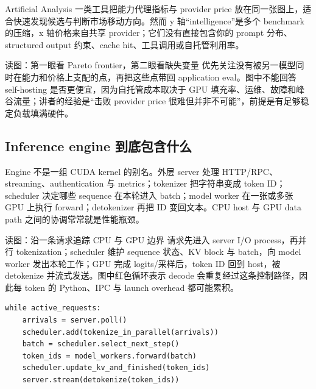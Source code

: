 Artificial Analysis 一类工具把能力代理指标与 provider price 放在同一张图上，适合快速发现候选与判断市场移动方向。然而 y 轴“intelligence”是多个 benchmark 的压缩，x 轴价格来自共享 provider；它们没有直接包含你的 prompt 分布、structured output 约束、cache hit、工具调用或自托管利用率。


\begin{knowledgebox}{读图：第一眼看 Pareto frontier，第二眼看缺失变量}
优先关注没有被另一模型同时在能力和价格上支配的点，再把这些点带回 application eval。图中不能回答 self-hosting 是否更便宜，因为自托管成本取决于 GPU 填充率、运维、故障和峰谷流量；讲者的经验是“击败 provider price 很难但并非不可能”，前提是有足够稳定负载填满硬件。
\end{knowledgebox}

\subsection{Inference engine 到底包含什么}

Engine 不是一组 CUDA kernel 的别名。外层 server 处理 HTTP/RPC、streaming、authentication 与 metrics；tokenizer 把字符串变成 token ID；scheduler 决定哪些 sequence 在本轮进入 batch；model worker 在一张或多张 GPU 上执行 forward；detokenizer 再把 ID 变回文本。CPU host 与 GPU data path 之间的协调常常就是性能瓶颈。


\begin{knowledgebox}{读图：沿一条请求追踪 CPU 与 GPU 边界}
请求先进入 server I/O process，再并行 tokenization；scheduler 维护 sequence 状态、KV block 与 batch，向 model worker 发出本轮工作；GPU 完成 logits/采样后，token ID 回到 host，被 detokenize 并流式发送。图中红色循环表示 decode 会重复经过这条控制路径，因此每 token 的 Python、IPC 与 launch overhead 都可能累积。
\end{knowledgebox}

\begin{lstlisting}[caption={Inference engine 的简化控制循环}]
while active_requests:
    arrivals = server.poll()
    scheduler.add(tokenize_in_parallel(arrivals))
    batch = scheduler.select_next_step()
    token_ids = model_workers.forward(batch)
    scheduler.update_kv_and_finished(token_ids)
    server.stream(detokenize(token_ids))
\end{lstlisting}

